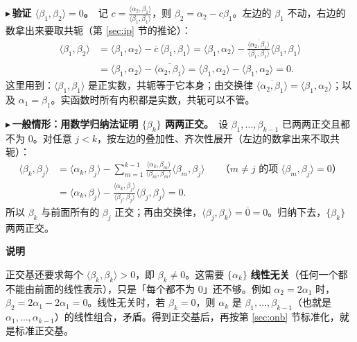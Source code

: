 \documentclass[UTF8,a4paper,11pt]{ctexart}
\newenvironment{note}{\begin{notebox}\textbf{说明}\par\smallskip}{\end{notebox}}
\newcounter{ex}[section]
\newcommand{\point}[1]{\par\addvspace{1ex}\noindent\textcolor{ptteal}{$\blacktriangleright$\,\textbf{#1}}\ }
\begin{document}
\point{验证 $\langle\beta_1,\beta_2\rangle=0$。}记 $c=\frac{\langle\alpha_2,\beta_1\rangle}{\langle\beta_1,\beta_1\rangle}$，则 $\beta_2=\alpha_2-c\beta_1$。左边的 $\beta_1$ 不动，右边的数拿出来要取共轭（第 \ref{sec:ip} 节的推论）：
\begin{align*}
\langle\beta_1,\beta_2\rangle
&=\langle\beta_1,\alpha_2\rangle-\overline{c}\,\langle\beta_1,\beta_1\rangle
=\langle\beta_1,\alpha_2\rangle-\frac{\overline{\langle\alpha_2,\beta_1\rangle}}{\langle\beta_1,\beta_1\rangle}\langle\beta_1,\beta_1\rangle\\
&=\langle\beta_1,\alpha_2\rangle-\overline{\langle\alpha_2,\beta_1\rangle}
=\langle\beta_1,\alpha_2\rangle-\langle\beta_1,\alpha_2\rangle=0 .
\end{align*}
这里用到：$\langle\beta_1,\beta_1\rangle$ 是正实数，共轭等于它本身；由交换律 $\overline{\langle\alpha_2,\beta_1\rangle}=\langle\beta_1,\alpha_2\rangle$；以及 $\alpha_1=\beta_1$。实函数时所有内积都是实数，共轭可以不管。

\point{一般情形：用数学归纳法证明 $\{\beta_k\}$ 两两正交。}设 $\beta_1,\dots,\beta_{k-1}$ 已两两正交且都不为 $0$。对任意 $j<k$，按左边的叠加性、齐次性展开（左边的数拿出来不取共轭）：
\begin{align*}
\langle\beta_k,\beta_j\rangle
&=\langle\alpha_k,\beta_j\rangle-\sum_{m=1}^{k-1}\frac{\langle\alpha_k,\beta_m\rangle}{\langle\beta_m,\beta_m\rangle}\langle\beta_m,\beta_j\rangle
&&\text{（$m\ne j$ 的项 $\langle\beta_m,\beta_j\rangle=0$）}\\
&=\langle\alpha_k,\beta_j\rangle-\frac{\langle\alpha_k,\beta_j\rangle}{\langle\beta_j,\beta_j\rangle}\langle\beta_j,\beta_j\rangle=0 .
\end{align*}
所以 $\beta_k$ 与前面所有的 $\beta_j$ 正交；再由交换律，$\langle\beta_j,\beta_k\rangle=\overline{0}=0$。归纳下去，$\{\beta_k\}$ 两两正交。

\begin{note}
正交基还要求每个 $\langle\beta_k,\beta_k\rangle>0$，即 $\beta_k\ne0$。这需要 $\{\alpha_k\}$ \textbf{线性无关}（任何一个都不能由前面的线性表示），只是「每个都不为 $0$」还不够。例如 $\alpha_2=2\alpha_1$ 时，$\beta_2=2\alpha_1-2\alpha_1=0$。线性无关时，若 $\beta_k=0$，则 $\alpha_k$ 是 $\beta_1,\dots,\beta_{k-1}$（也就是 $\alpha_1,\dots,\alpha_{k-1}$）的线性组合，矛盾。得到正交基后，再按第 \ref{sec:onb} 节标准化，就是标准正交基。
\end{note}
\end{document}
